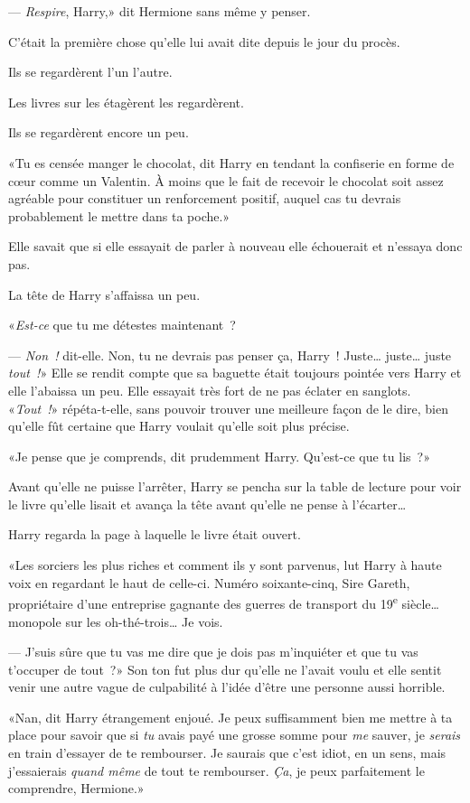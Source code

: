 --- \emph{Respire}, Harry,» dit Hermione sans même y penser.

C'était la première chose qu'elle lui avait dite depuis le jour du procès.

Ils se regardèrent l'un l'autre.

Les livres sur les étagèrent les regardèrent.

Ils se regardèrent encore un peu.

«Tu es censée manger le chocolat, dit Harry en tendant la confiserie en forme de cœur comme un Valentin. À moins que le fait de recevoir le chocolat soit assez agréable pour constituer un renforcement positif, auquel cas tu devrais probablement le mettre dans ta poche.»

Elle savait que si elle essayait de parler à nouveau elle échouerait et n'essaya donc pas.

La tête de Harry s'affaissa un peu.

«\emph{Est-ce} que tu me détestes maintenant~?

--- \emph{Non~!} dit-elle. Non, tu ne devrais pas penser ça, Harry~! Juste… juste… juste \emph{tout~!}» Elle se rendit compte que sa baguette était toujours pointée vers Harry et elle l'abaissa un peu. Elle essayait très fort de ne pas éclater en sanglots. «\emph{Tout~!}» répéta-t-elle, sans pouvoir trouver une meilleure façon de le dire, bien qu'elle fût certaine que Harry voulait qu'elle soit plus précise.

«Je pense que je comprends, dit prudemment Harry. Qu'est-ce que tu lis~?»

Avant qu'elle ne puisse l'arrêter, Harry se pencha sur la table de lecture pour voir le livre qu'elle lisait et avança la tête avant qu'elle ne pense à l'écarter…

Harry regarda la page à laquelle le livre était ouvert.

«Les sorciers les plus riches et comment ils y sont parvenus, lut Harry à haute voix en regardant le haut de celle-ci. Numéro soixante-cinq, Sire Gareth, propriétaire d'une entreprise gagnante des guerres de transport du 19\textsuperscript{e} siècle… monopole sur les oh-thé-trois… Je vois.

--- J'suis sûre que tu vas me dire que je dois pas m'inquiéter et que tu vas t'occuper de tout~?» Son ton fut plus dur qu'elle ne l'avait voulu et elle sentit venir une autre vague de culpabilité à l'idée d'être une personne aussi horrible.

«Nan, dit Harry étrangement enjoué. Je peux suffisamment bien me mettre à ta place pour savoir que si \emph{tu} avais payé une grosse somme pour \emph{me} sauver, je \emph{serais} en train d'essayer de te rembourser. Je saurais que c'est idiot, en un sens, mais j'essaierais \emph{quand même} de tout te rembourser. \emph{Ça}, je peux parfaitement le comprendre, Hermione.»

